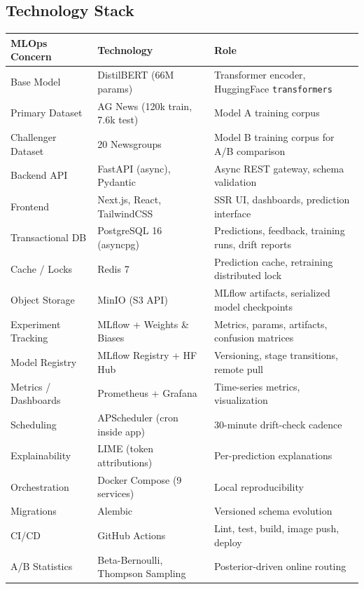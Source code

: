 \documentclass[11pt, a4paper]{article}
\begin{document}
\subsection{Technology Stack}
\begin{center}\small
\begin{tabular}{@{}lll@{}}
\toprule
\textbf{MLOps Concern} & \textbf{Technology} & \textbf{Role} \\
\midrule
Base Model          & DistilBERT (66M params)         & Transformer encoder, HuggingFace \texttt{transformers} \\
Primary Dataset     & AG News (120k train, 7.6k test) & Model A training corpus \\
Challenger Dataset  & 20 Newsgroups                   & Model B training corpus for A/B comparison \\
Backend API         & FastAPI (async), Pydantic       & Async REST gateway, schema validation \\
Frontend            & Next.js, React, TailwindCSS     & SSR UI, dashboards, prediction interface \\
Transactional DB    & PostgreSQL 16 (asyncpg)         & Predictions, feedback, training runs, drift reports \\
Cache / Locks       & Redis 7                         & Prediction cache, retraining distributed lock \\
Object Storage      & MinIO (S3 API)                  & MLflow artifacts, serialized model checkpoints \\
Experiment Tracking & MLflow + Weights \& Biases      & Metrics, params, artifacts, confusion matrices \\
Model Registry      & MLflow Registry + HF Hub        & Versioning, stage transitions, remote pull \\
Metrics / Dashboards& Prometheus + Grafana            & Time-series metrics, visualization \\
Scheduling          & APScheduler (cron inside app)   & 30-minute drift-check cadence \\
Explainability      & LIME (token attributions)       & Per-prediction explanations \\
Orchestration       & Docker Compose (9 services)     & Local reproducibility \\
Migrations          & Alembic                         & Versioned schema evolution \\
CI/CD               & GitHub Actions                  & Lint, test, build, image push, deploy \\
A/B Statistics      & Beta-Bernoulli, Thompson Sampling & Posterior-driven online routing \\
\bottomrule
\end{tabular}
\end{center}
\end{document}
